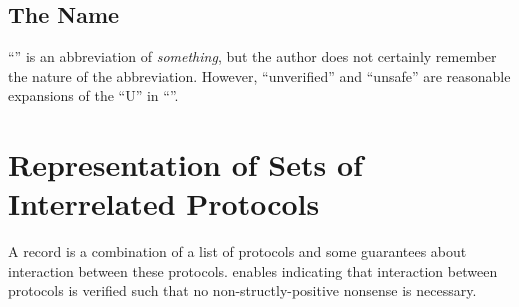 \documentclass{report}
\begin{document}
\section{The Name}
``'' is an abbreviation of \emph{something}, but the author does not certainly remember the nature of the abbreviation.  However, ``unverified'' and ``unsafe'' are reasonable expansions of the ``U'' in ``''.

\chapter{Representation of Sets of Interrelated Protocols}
A  record is a combination of a list of protocols and some guarantees about interaction between these protocols.   enables indicating that interaction between protocols is verified such that no non-structly-positive nonsense is necessary.
\end{document}
